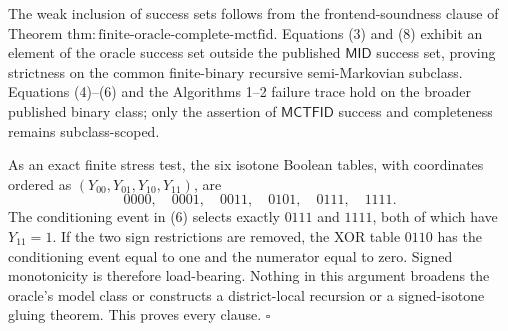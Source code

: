 The weak inclusion of success sets follows from the frontend-soundness clause of Theorem \(\mathrm{thm:finite\text{-}oracle\text{-}complete\text{-}mctfid}\).  Equations (3) and (8) exhibit an element of the oracle success set outside the published \(\mathsf{MID}\) success set, proving strictness on the common finite-binary recursive semi-Markovian subclass.  Equations (4)--(6) and the Algorithms 1--2 failure trace hold on the broader published binary class; only the assertion of \(\mathsf{MCTFID}\) success and completeness remains subclass-scoped.

As an exact finite stress test, the six isotone Boolean tables, with coordinates ordered as \((Y_{00},Y_{01},Y_{10},Y_{11})\), are
\[
 0000,\quad 0001,\quad 0011,\quad 0101,\quad 0111,\quad 1111.
\]
The conditioning event in (6) selects exactly \(0111\) and \(1111\), both of which have \(Y_{11}=1\).  If the two sign restrictions are removed, the XOR table \(0110\) has the conditioning event equal to one and the numerator equal to zero.  Signed monotonicity is therefore load-bearing.  Nothing in this argument broadens the oracle's model class or constructs a district-local recursion or a signed-isotone gluing theorem.  This proves every clause. \(\square\)